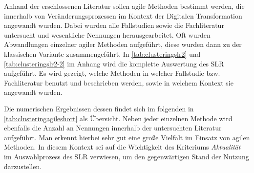 
Anhand der erschlossenen Literatur sollen agile Methoden bestimmt werden, die innerhalb von Veränderungsprozessen im Kontext der Digitalen Transformation angewandt wurden. Dabei wurden alle Fallstudien sowie die Fachliteratur untersucht und wesentliche Nennungen herausgearbeitet. Oft wurden Abwandlungen einzelner agiler Methoden aufgeführt, diese wurden dann zu der klassischen Variante zusammengeführt. In  \ref{tab:clusteringslr2} und \ref{tab:clusteringslr2-2} im Anhang wird die komplette Auswertung des SLR aufgeführt. Es wird gezeigt, welche Methoden in welcher Fallstudie bzw. Fachliteratur benutzt und beschrieben werden, sowie in welchem Kontext sie angewandt wurden. 

Die numerischen Ergebnissen dessen findet sich im folgenden in \ref{tab:clusteringagileshort} als Übersicht. Neben jeder einzelnen Methode wird ebenfalls die Anzahl an Nennungen innerhalb der untersuchten Literatur aufgeführt. Man erkennt hierbei sehr gut eine große Vielfalt im Einsatz von agilen Methoden. In diesem Kontext sei auf die Wichtigkeit des Kriteriums \textit{Aktualität} im Auswahlprozess des SLR verwiesen, um den gegenwärtigen Stand der Nutzung darzustellen.

